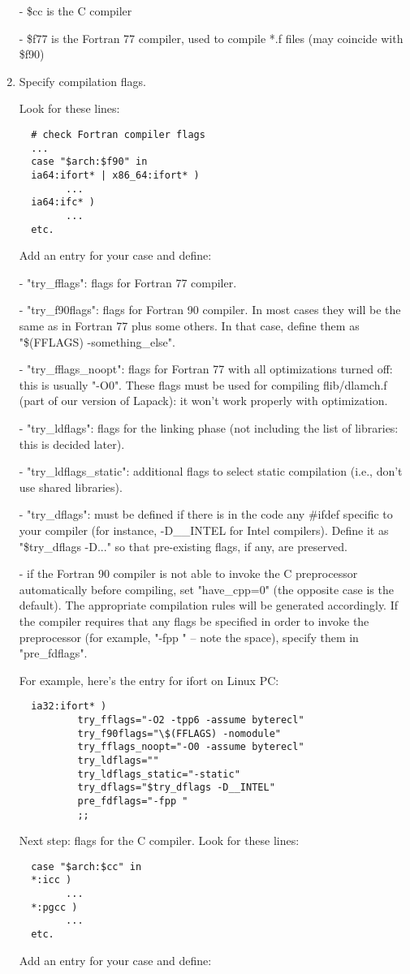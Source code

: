 \documentclass[12pt,a4paper]{article}
\begin{document}
\begin{enumerate}
- \$cc is the C compiler

- \$f77 is the Fortran 77 compiler, used to compile *.f files
(may coincide with \$f90)

\item Specify compilation flags.

Look for these lines:
\begin{verbatim}
  # check Fortran compiler flags
  ...
  case "$arch:$f90" in
  ia64:ifort* | x86_64:ifort* )
        ...
  ia64:ifc* )
        ...
  etc.
\end{verbatim}
Add an entry for your case and define:

- "try\_fflags": flags for Fortran 77 compiler.

- "try\_f90flags": flags for Fortran 90 compiler.
In most cases they will be the same as in Fortran 77 plus some
others.  In that case, define them as "\$(FFLAGS) -something\_else".

- "try\_fflags\_noopt": flags for Fortran 77 with all optimizations
turned off: this is usually "-O0".
These flags must be used for compiling flib/dlamch.f (part of our
version of Lapack): it won't work properly with optimization.

- "try\_ldflags": flags for the linking phase (not including the list
of libraries: this is decided later). 

- "try\_ldflags\_static": additional flags to select static compilation
(i.e., don't use shared libraries).

- "try\_dflags": must be defined if there is in the code any \#ifdef
specific to your compiler (for instance, -D\_\_INTEL for Intel
compilers).  Define it as "\$try\_dflags -D..." so that pre-existing
flags, if any, are preserved.

- if the Fortran 90 compiler is not able to invoke the C preprocessor
automatically before compiling, set "have\_cpp=0" (the opposite case
is the default). The appropriate compilation rules will be generated 
accordingly. If the compiler requires that any flags be specified in
order to invoke the preprocessor (for example, "-fpp " -- note the 
space), specify them in "pre\_fdflags".

For example, here's the entry for ifort on Linux PC:
\begin{verbatim}
  ia32:ifort* )
          try_fflags="-O2 -tpp6 -assume byterecl"
          try_f90flags="\$(FFLAGS) -nomodule"
          try_fflags_noopt="-O0 -assume byterecl"
          try_ldflags=""
          try_ldflags_static="-static"
          try_dflags="$try_dflags -D__INTEL"
          pre_fdflags="-fpp "
          ;;
\end{verbatim}
Next step: flags for the C compiler. Look for these lines:
\begin{verbatim}
  case "$arch:$cc" in
  *:icc )
        ...
  *:pgcc )
        ...
  etc.
\end{verbatim}
Add an entry for your case and define:


\end{enumerate}
\end{document}
